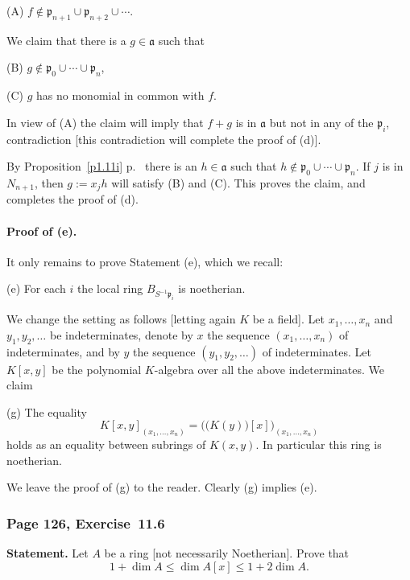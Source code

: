 \documentclass[12pt,letterpaper]{article}%
\newcommand{\mf}{\mathfrak}
\newcommand{\aaa}{\mf a}
\newcommand{\ppp}{\mf p}
\newcommand{\nn}{\noindent}
\begin{document}
\qquad(A) $f\notin\ppp_{n+1}\cup\ppp_{n+2}\cup\cdots$. 

We claim that there is a $g\in\aaa$ such that 

\qquad(B) $g\notin\ppp_0\cup\cdots\cup\ppp_n$, 

\qquad(C) $g$ has no monomial in common with $f$.

In view of (A) the claim will imply that $f+g$ is in $\aaa$ but not in any of the $\ppp_i$, contradiction [this contradiction will complete the proof of (d)].
 
By Proposition~\ref{p1.11i} p.~\pageref{p1.11i} there is an $h\in\aaa$ such that $h\notin\ppp_0\cup\cdots\cup\ppp_n$. If $j$ is in $N_{n+1}$, then $g:=x_jh$ will satisfy (B) and (C). This proves the claim, and completes the proof of (d).%

\paragraph{Proof of (e).}

It only remains to prove Statement (e), which we recall:

\nn(e) For each $i$ the local ring $B_{S^{-1}\ppp_i}$ is noetherian.

We change the setting as follows [letting again $K$ be a field]. Let $x_1,\ldots,x_n$ and $y_1,y_2,\ldots$ be indeterminates, denote by $x$ the sequence $(x_1,\ldots,x_n)$ of indeterminates, and by $y$ the sequence $(y_1,y_2,\ldots)$ of indeterminates. Let $K[x,y]$ be the polynomial $K$-algebra over all the above indeterminates. We claim 

\nn(g) The equality 
$$
K[x,y]_{(x_1,\ldots,x_n)}=\Big(\big(K(y)\big)[x]\Big)_{(x_1,\ldots,x_n)}
$$ 
holds as an equality between subrings of $K(x,y)$. In particular this ring is noetherian. 

We leave the proof of (g) to the reader. Clearly (g) implies (e). 

\subsubsection{Page 126, Exercise~11.6}\label{ex11.6}%

\textbf{Statement.} Let $A$ be a ring [not necessarily Noetherian]. Prove that 
$$
1+\dim A\le\dim A[x]\le1+2\dim A.
$$
\end{document}
